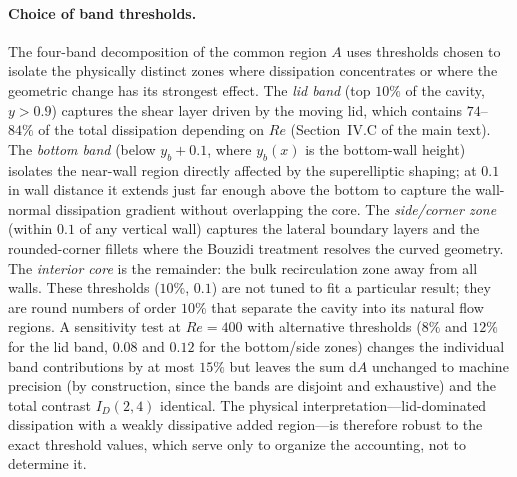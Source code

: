 \paragraph{Choice of band thresholds.}
The four-band decomposition of the common region $A$ uses thresholds chosen to isolate the physically distinct zones where dissipation concentrates or where the geometric change has its strongest effect. The \emph{lid band} (top $10\%$ of the cavity, $y>0.9$) captures the shear layer driven by the moving lid, which contains $74$--$84\%$ of the total dissipation depending on $Re$ (Section~IV.C of the main text). The \emph{bottom band} (below $y_b+0.1$, where $y_b(x)$ is the bottom-wall height) isolates the near-wall region directly affected by the superelliptic shaping; at $0.1$ in wall distance it extends just far enough above the bottom to capture the wall-normal dissipation gradient without overlapping the core. The \emph{side/corner zone} (within $0.1$ of any vertical wall) captures the lateral boundary layers and the rounded-corner fillets where the Bouzidi treatment resolves the curved geometry. The \emph{interior core} is the remainder: the bulk recirculation zone away from all walls. These thresholds ($10\%$, $0.1$) are not tuned to fit a particular result; they are round numbers of order $10\%$ that separate the cavity into its natural flow regions. A sensitivity test at $Re=400$ with alternative thresholds ($8\%$ and $12\%$ for the lid band, $0.08$ and $0.12$ for the bottom/side zones) changes the individual band contributions by at most $15\%$ but leaves the sum $\mathrm{d}A$ unchanged to machine precision (by construction, since the bands are disjoint and exhaustive) and the total contrast $I_D(2,4)$ identical. The physical interpretation---lid-dominated dissipation with a weakly dissipative added region---is therefore robust to the exact threshold values, which serve only to organize the accounting, not to determine it.


